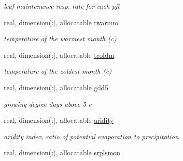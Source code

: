 \begin{DoxyCompactItemize}
\begin{DoxyCompactList}\small\item\em leaf maintenance resp. rate for each pft \end{DoxyCompactList}\item 
\hypertarget{structctem__statevars_1_1veg__gat_a6f21785182abb5694306d94bf0f760d8}{}real, dimension(\+:), allocatable \hyperlink{structctem__statevars_1_1veg__gat_a6f21785182abb5694306d94bf0f760d8}{twarmm}\label{structctem__statevars_1_1veg__gat_a6f21785182abb5694306d94bf0f760d8}

\begin{DoxyCompactList}\small\item\em temperature of the warmest month (c) \end{DoxyCompactList}\item 
\hypertarget{structctem__statevars_1_1veg__gat_a66444e12e822ef9c9e76b3d394deeb88}{}real, dimension(\+:), allocatable \hyperlink{structctem__statevars_1_1veg__gat_a66444e12e822ef9c9e76b3d394deeb88}{tcoldm}\label{structctem__statevars_1_1veg__gat_a66444e12e822ef9c9e76b3d394deeb88}

\begin{DoxyCompactList}\small\item\em temperature of the coldest month (c) \end{DoxyCompactList}\item 
\hypertarget{structctem__statevars_1_1veg__gat_a8e221a161b99dfbf9ed119b20d10fa63}{}real, dimension(\+:), allocatable \hyperlink{structctem__statevars_1_1veg__gat_a8e221a161b99dfbf9ed119b20d10fa63}{gdd5}\label{structctem__statevars_1_1veg__gat_a8e221a161b99dfbf9ed119b20d10fa63}

\begin{DoxyCompactList}\small\item\em growing degree days above 5 c \end{DoxyCompactList}\item 
\hypertarget{structctem__statevars_1_1veg__gat_a15e5cd9b1f6b98a935cf5b32b27d3538}{}real, dimension(\+:), allocatable \hyperlink{structctem__statevars_1_1veg__gat_a15e5cd9b1f6b98a935cf5b32b27d3538}{aridity}\label{structctem__statevars_1_1veg__gat_a15e5cd9b1f6b98a935cf5b32b27d3538}

\begin{DoxyCompactList}\small\item\em aridity index, ratio of potential evaporation to precipitation \end{DoxyCompactList}\item 
\hypertarget{structctem__statevars_1_1veg__gat_afe1bebb7494fe1a26c90e0aeb78f9057}{}real, dimension(\+:), allocatable \hyperlink{structctem__statevars_1_1veg__gat_afe1bebb7494fe1a26c90e0aeb78f9057}{srplsmon}\label{structctem__statevars_1_1veg__gat_afe1bebb7494fe1a26c90e0aeb78f9057}


\end{DoxyCompactItemize}
